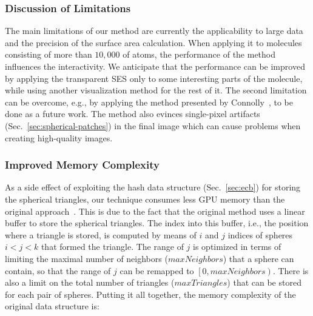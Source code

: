 \subsubsection{Discussion of Limitations}
The main limitations of our method are currently the applicability to large data and the precision of the surface area calculation.
When applying it to molecules consisting of more than $10,000$ of atoms, the performance of the method influences the interactivity.
We anticipate that the performance can be improved by applying the transparent SES only to some interesting parts of the molecule, while using another visualization method for the rest of it.
The second limitation can be overcome, e.g., by applying the method presented by Connolly~\cite{connolly1983analytical}, to be done as a future work.
The method also evinces single-pixel artifacts (Sec.~\ref{sec:spherical-patches}) in the final image which can cause problems when creating high-quality images.

\subsubsection{Improved Memory Complexity}

As a side effect of exploiting the hash data structure (Sec.~\ref{sec:ecb}) for storing the spherical triangles, our technique consumes less GPU memory than the original approach~\cite{krone2011parallel}.
This is due to the fact that the original method uses a linear buffer to store the spherical triangles.
The index into this buffer, i.e., the position where a triangle is stored, is computed by means of $i$ and $j$ indices of spheres $i < j < k$ that formed the triangle.
The range of $j$ is optimized in terms of limiting the maximal number of neighbors ($maxNeighbors$) that a sphere can contain, so that the range of $j$ can be remapped to $\left[0, maxNeighbors\right)$.
There is also a limit on the total number of triangles ($maxTriangles$) that can be stored for each pair of spheres.
Putting it all together, the memory complexity of the original data structure is:

